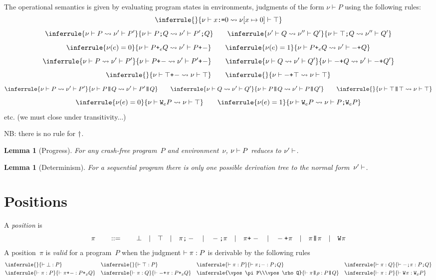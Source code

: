\documentclass[a4paper]{article}
\theoremstyle{theorem}
\newtheorem{lemma}[theorem]{Lemma}
\theoremstyle{remark}
\begin{document}
The operational semantics is given by evaluating program states in environments,
\ie judgments of the form $\nu\vdash P$ using the following rules:
\[
  \inferrule{\null}{\penv{\nu}{\pset x\Bfalse}\redto\penv{\nu[x\mapsto\Bfalse]}{\pskip}}
\]
\[
  \inferrule{\penv\nu P\redto\penv{\nu'}{P'}}{\penv{\nu}{\pseq PQ}\redto\penv{\nu'}{\pseq{P'}{Q}}}
  \qquad
  \inferrule{\penv{\nu'}{Q}\redto\penv{\nu''}{Q'}}{\penv{\nu}{\pseq \pskip Q}\redto\penv{\nu''}{Q'}}
\]
\[
  \inferrule{\nu(e)=\Bfalse}{\penv{\nu}{\por ePQ}\redto\penv{\nu'}{\porl P}}
  \qquad
  \inferrule{\nu(e)=\Btrue}{\penv{\nu}{\por ePQ}\redto\penv{\nu'}{\porr Q}}
\]
\[
  \inferrule{\penv\nu P\redto\penv{\nu'}{P'}}{\penv{\nu}{\porl P}\redto\penv{\nu'}{\porl{P'}}}
  \qquad
  \inferrule{\penv\nu Q\redto\penv{\nu'}{Q'}}{\penv{\nu}{\porr Q}\redto\penv{\nu'}{\porr{Q'}}}
\]
\[
  \inferrule{\null}{\penv{\nu}{\porl\pskip}\redto\penv{\nu}{\pskip}}
  \qquad
  \inferrule{\null}{\penv{\nu}{\porr\pskip}\redto\penv{\nu}{\pskip}}
\]
\[
  \inferrule{\penv\nu P\redto\penv{\nu'}{P'}}{\penv{\nu}{\ppar PQ}\redto\penv{\nu'}{\ppar{P'}{Q}}}
  \qquad
  \inferrule{\penv\nu Q\redto\penv{\nu'}{Q'}}{\penv{\nu}{\ppar PQ}\redto\penv{\nu'}{\ppar{P}{Q'}}}
  \qquad
  \inferrule{\null}{\penv\nu{\ppar\pskip\pskip}\redto\penv\nu\pskip}
\]
\[
  \inferrule{\nu(e)=\Bfalse}{\penv\nu{\pwhile eP}\redto\penv\nu\pskip}
  \qquad
  \inferrule{\nu(e)=\Btrue}{\penv\nu{\pwhile eP}\redto\penv\nu{\pseq{P}{\pwhile eP}}}
\]
etc. (we must close under transitivity...)

NB: there is no rule for $\dagger$.

\begin{lemma}[Progress]
  For any crash-free program~$P$ and environment~$\nu$, $\nu\vdash P$ reduces to
  $\nu'\vdash$.
\end{lemma}

\begin{lemma}[Determinism]
  For a sequential program there is only one possible derivation tree to the
  normal form~$\nu'\vdash$.
\end{lemma}

\section{Positions}
A \emph{position} is
\[
  \pi
  \qquad::=\qquad
  \bot
  \quad|\quad
  \top
  \quad|\quad
  \pi\texttt{;}-
  \quad|\quad
  -\texttt{;}\pi
  \quad|\quad
  \pi\texttt{+}_{}-
  \quad|\quad
  -\texttt{+}_{}\pi
  \quad|\quad
  \pi\texttt{|\!\!|}\pi
  \quad|\quad
  \texttt{W}_{}\pi
\]
A position~$\pi$ is \emph{valid} for a program~$P$ when the judgment
$\vdash \pi:P$ is derivable by the following rules
\begin{align*}
  &
  \inferrule{\null}{\vpos\pbot P}
  &&
  \inferrule{\null}{\vpos\ptop P}
  &&
  \inferrule{\vpos\pi P}{\vpos{\pseql\pi}{\pseq PQ}}
  &&
  \inferrule{\vpos\pi Q}{\vpos{\pseqr\pi}{\pseq PQ}}
  \\
  &
  \inferrule{\vpos\pi P}{\vpos{\porl\pi}{\por xPQ}}
  &&
  \inferrule{\vpos\pi Q}{\vpos{\porr\pi}{\por xPQ}}
  &&
  \inferrule{\vpos\pi P\\\vpos\rho Q}{\vpos{\ppar\pi\rho}{\ppar PQ}}
  &&
  \inferrule{\vpos\pi P}{\vpos{\ploopl\pi}{\ploop xP}}
\end{align*}
\end{document}
